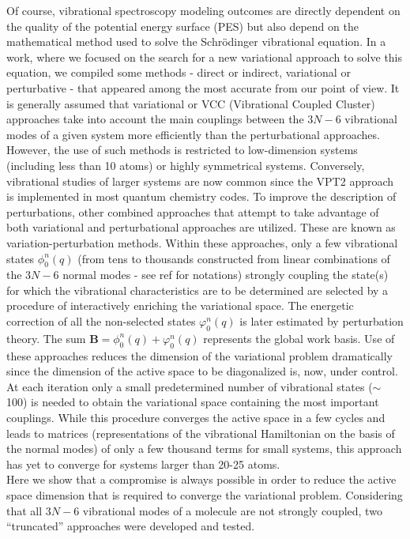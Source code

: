	Of course, vibrational spectroscopy modeling outcomes are directly dependent on the quality of the potential energy surface (PES) but also depend on the mathematical method used to solve the Schrödinger vibrational equation. In a work,\cite{garnier2016adaptive} where we focused on the search for a new variational approach to solve this equation, we compiled some methods - direct or indirect, variational or perturbative - that appeared among the most accurate from our point of view. It is generally assumed that variational or VCC (Vibrational Coupled Cluster) approaches take into account the main couplings between the $3N - 6$ vibrational modes of a given system more efficiently than the perturbational approaches. However, the use of such methods is restricted to low-dimension systems (including less than 10 atoms) or highly symmetrical systems. Conversely, vibrational studies of larger systems are now common since the VPT2 approach is implemented in most quantum chemistry codes. To improve the description of perturbations, other combined approaches that attempt to take advantage of both variational and perturbational approaches are utilized. These are known as variation-perturbation methods. Within these approaches, only a few vibrational states $\phi_0^n (q)$ (from tens to thousands constructed from linear combinations of the $3N - 6$ normal modes - see ref\cite{garnier2016adaptive} for notations) strongly coupling the state(s) for which the vibrational characteristics are to be determined are selected by a procedure of interactively enriching the variational space. The energetic correction of all the non-selected states $\varphi_0^n (q)$ is later estimated by perturbation theory. The sum $\textbf{B} = \phi_0^n (q) + \varphi_0^n (q)$ represents the global work basis. Use of these approaches reduces the dimension of the variational problem dramatically\cite{baraille2001calculation,scribano2008iterative} since the dimension of the active space to be diagonalized is, now, under control. At each iteration only a small predetermined number of vibrational states ($\sim$ 100) is needed to obtain the variational space containing the most important couplings. While this procedure converges the active space in a few cycles and leads to matrices (representations of the vibrational Hamiltonian on the basis of the normal modes) of only a few thousand terms for small systems, this approach has yet to converge for systems larger than 20-25 atoms.\\
	
	 Here we show that a compromise is always possible in order to reduce the active space dimension that is required to converge the variational problem. Considering that all $3N-6$ vibrational modes of a molecule are not strongly coupled, two “truncated” approaches were developed and tested.\\
	
